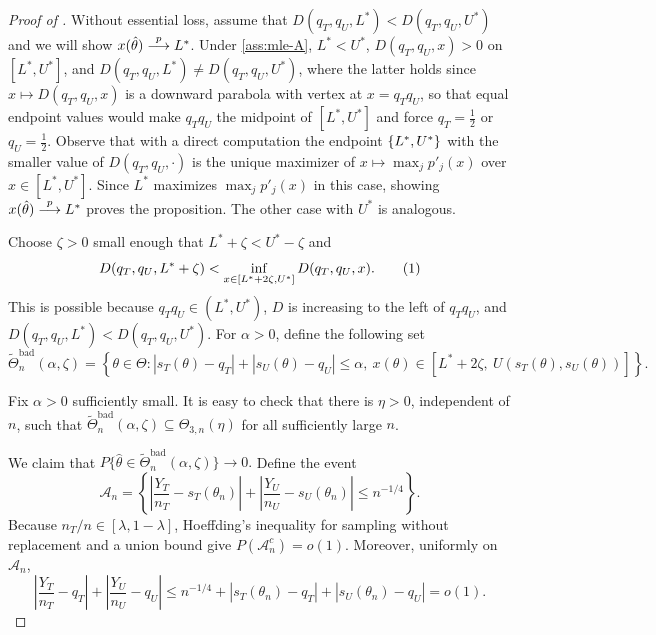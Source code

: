 \documentclass[12pt,reqno]{amsart}
\begin{document}
\begin{proof}[Proof of ]
Without essential loss, assume that
$
D(q_T,q_U,L^*)<D(q_T,q_U,U^*)
$ and we will show $x(\hat\theta) \overset{p}{\longrightarrow} L^*$.
Under \eqref{ass:mle-A}, \(L^*<U^*\), \(D(q_T,q_U,x)>0\) on
\([L^*,U^*]\), and
$
D(q_T,q_U,L^*) \neq D(q_T,q_U,U^*)$, where the latter holds since \(x \mapsto D(q_T,q_U,x)\) is a downward parabola with vertex at \(x = q_Tq_U\), so that equal endpoint values would make \(q_Tq_U\) the midpoint of \([L^*,U^*]\) and force \(q_T = \tfrac{1}{2}\) or \(q_U = \tfrac{1}{2}\). Observe that with a direct computation the endpoint $
\left\{{L^*, U^*}\right\}$ with the smaller
value of $D(q_T, q_U, \cdot)$ is the unique maximizer of $x\mapsto \max_j p'_j(x)$ over
$x \in [L^*, U^*]$.
Since $L^*$ maximizes $\max_j p'_j(x)$ in this
case, showing $x(\hat\theta) \overset{p}{\longrightarrow} L^*$ proves the proposition.
The other case with $U^*$ is analogous.

Choose \(\zeta>0\) small enough that
$
L^*+\zeta<U^*-\zeta
$
and
\[
D(q_T,q_U,L^*+\zeta)
<
\inf_{x\in[L^*+2\zeta,U^*]}D(q_T,q_U,x). \numberthis \label{eq:bad-set-d-gap}
\]
This is possible because \(q_Tq_U\in(L^*,U^*)\), \(D\) is increasing to the left
of \(q_Tq_U\), and \(D(q_T,q_U,L^*)<D(q_T,q_U,U^*)\). For \(\alpha>0\), define the
following set
\[
\widetilde\Theta^{\mathrm{bad}}_n(\alpha,\zeta)
=
\left\{
\theta\in\Theta:
|s_T(\theta)-q_T|+|s_U(\theta)-q_U|\le\alpha,\
x(\theta)\in[L^*+2\zeta,\ U(s_T(\theta),s_U(\theta))]
\right\}.
\]
{Fix \(\alpha>0\) sufficiently small.  It is easy to check that there is
\(\eta>0\), independent of \(n\), such that
$
\widetilde\Theta^{\mathrm{bad}}_n(\alpha,\zeta)
\subseteq\Theta_{3,n}(\eta)
$
for all sufficiently large \(n\).

We claim that
\(
P\{\hat\theta\in\widetilde\Theta^{\mathrm{bad}}_n(\alpha,\zeta)\}\to0.
\)
Define the event
\[
\mathcal A_n
=
\left\{
\left|\frac{Y_T}{n_T}-s_T(\theta_n)\right|
+
\left|\frac{Y_U}{n_U}-s_U(\theta_n)\right|
\le n^{-1/4}
\right\}.
\]
Because \(n_T/n\in[\lambda,1-\lambda]\), Hoeffding's inequality for sampling
without replacement and a union bound give \(P(\mathcal A_n^c)=o(1)\).  Moreover,
uniformly on \(\mathcal A_n\),
\[
\left|\frac{Y_T}{n_T}-q_T\right|
+
\left|\frac{Y_U}{n_U}-q_U\right|
\le
n^{-1/4}
+|s_T(\theta_n)-q_T|
+|s_U(\theta_n)-q_U|
=o(1).
\]

}
\end{proof}
\end{document}
